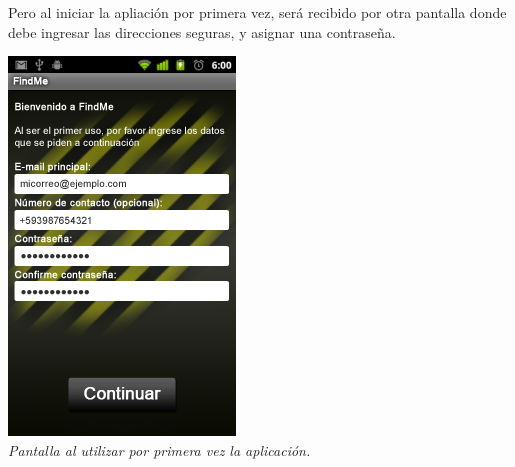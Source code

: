 \documentclass{article}
\begin{document}
Pero al iniciar la apliación por primera vez, será recibido por otra pantalla donde debe ingresar las direcciones seguras, y asignar una contraseña.
\begin{center}
\includegraphics{findmefirstscreen}\\\emph{Pantalla al utilizar por primera vez la aplicación.}
\end{center}
\end{document}
